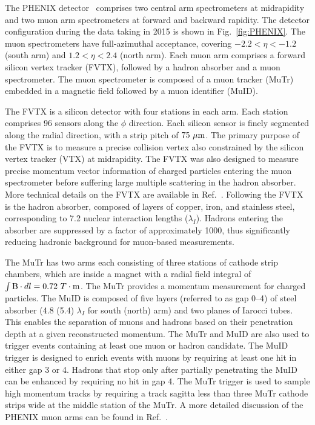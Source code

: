 \documentclass[twocolumn,letterpaper,aps,prc,longbibliography,superscriptaddress,nofootinbib,floatfix]{revtex4-2}
\begin{document}
The PHENIX detector~\cite{Adcox:2003zm} comprises two central arm 
spectrometers at midrapidity and two muon arm spectrometers at forward 
and backward rapidity.  The detector configuration during the data 
taking in 2015 is shown in Fig.~\ref{fig:PHENIX}. The muon spectrometers 
have full-azimuthal acceptance, covering $-2.2<\eta<-1.2$ (south arm) 
and $1.2<\eta<2.4$ (north arm). Each muon arm comprises a forward 
silicon vertex tracker (FVTX), followed by a hadron absorber and a muon 
spectrometer. The muon spectrometer is composed of a muon tracker (MuTr) 
embedded in a magnetic field followed by a muon identifier (MuID).

The FVTX is a silicon detector with four stations in each arm.  Each 
station comprises 96 sensors along the $\phi$ direction. Each silicon 
sensor is finely segmented along the radial direction, with a strip 
pitch of $75~\mu{\rm m}$. The primary purpose of the FVTX is to measure 
a precise collision vertex also constrained by the silicon vertex 
tracker (VTX) at midrapidity. The FVTX was also designed to measure 
precise momentum vector information of charged particles entering the 
muon spectrometer before suffering large multiple scattering in the 
hadron absorber. More technical details on the FVTX are available in 
Ref.~\cite{Aidala:2013vna}. Following the FVTX is the hadron absorber, 
composed of layers of copper, iron, and stainless steel, corresponding 
to 7.2 nuclear interaction lengths ($\lambda_{I}$).  Hadrons entering 
the absorber are suppressed by a factor of approximately 1000, thus 
significantly reducing hadronic background for muon-based measurements.

The MuTr has two arms each consisting of three stations of cathode strip 
chambers, which are inside a magnet with a radial field integral of 
$\int{{\rm B}\cdot dl}=0.72~T\cdot{\rm m}$.  The MuTr provides a 
momentum measurement for charged particles. The MuID is composed of five 
layers (referred to as gap 0--4) of steel absorber (4.8 (5.4) 
$\lambda_{I}$ for south (north) arm) and two planes of Iarocci tubes.  
This enables the separation of muons and hadrons based on their 
penetration depth at a given reconstructed momentum. The MuTr and MuID 
are also used to trigger events containing at least one muon or hadron 
candidate. The MuID trigger is designed to enrich events with muons by 
requiring at least one hit in either gap 3 or 4. Hadrons that stop only 
after partially penetrating the MuID can be enhanced by requiring no hit 
in gap 4. The MuTr trigger is used to sample high momentum tracks by 
requiring a track sagitta less than three MuTr cathode strips wide at 
the middle station of the MuTr.  A more detailed discussion of the 
PHENIX muon arms can be found in 
Ref.~\cite{Akikawa:2003zs,Adachi:2013qha}.
\end{document}
